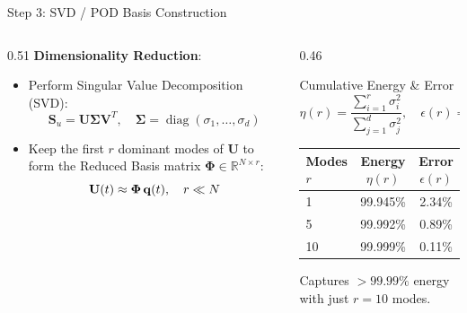 \begin{frame}{Step 3: SVD / POD Basis Construction}
  \small
  \begin{columns}[T]
    \begin{column}{0.51\textwidth}
      \textbf{Dimensionality Reduction}:
      \begin{itemize}
        \setlength{\itemsep}{0.1cm}
        \item Perform Singular Value Decomposition (SVD):
        \[
          \mathbf{S}_u = \mathbf{U} \boldsymbol{\Sigma} \mathbf{V}^T, \quad \boldsymbol{\Sigma} = \operatorname{diag}(\sigma_1, \dots, \sigma_d)
        \]
        \item Keep the first $r$ dominant modes of $\mathbf{U}$ to form the Reduced Basis matrix $\boldsymbol{\Phi} \in \mathbb{R}^{N \times r}$:
        \[
          \mathbf{U}(t) \approx \boldsymbol{\Phi}\,\mathbf{q}(t), \quad r\ll N
        \]
      \end{itemize}
    \end{column}
    \begin{column}{0.46\textwidth}
      \begin{block}{Cumulative Energy \& Error}
        \scriptsize
        \centering
        \[
          \eta(r) = \frac{\sum_{i=1}^{r} \sigma_i^2}{\sum_{j=1}^{d} \sigma_j^2}, \quad \epsilon(r) = \sqrt{1 - \eta(r)}
        \]
        \vspace{-0.15cm}
        \begin{tabular}{lcc}
          \toprule
          Modes $r$ & Energy $\eta(r)$ & Error $\epsilon(r)$ \\
          \midrule
          1  & 99.945\% & 2.34\% \\
          5  & 99.992\% & 0.89\% \\
          10 & 99.999\% & 0.11\% \\
          \bottomrule
        \end{tabular}
        \par\vspace{0.08cm}
        Captures $>99.99\%$ energy with just $r=10$ modes.
      \end{block}
    \end{column}
  \end{columns}
\end{frame}

